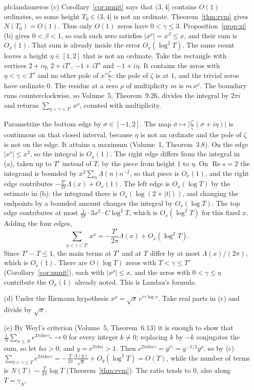 \begin{solution}{pb:landauzeros}
(c) Corollary~\ref{cor:nunit} says that $(3,4]$ contains $O(1)$ ordinates, so some height $T_0\in(3,4]$ is not an ordinate. Theorem~\ref{thm:rvm} gives $N(T_0)=O(1)$. Thus only $O(1)$ zeros have $0<\gamma\le3$. Proposition~\ref{prop:xi}(b) gives $0<\beta<1$, so each such zero satisfies $|x^\rho|=x^\beta\le x$, and their sum is $O_x(1)$. That sum is already inside the error $O_x(\log^2T)$. The same count leaves a height $\eta\in[1,2]$ that is not an ordinate. Take the rectangle with vertices $2+i\eta$, $2+iT'$, $-1+iT'$ and $-1+i\eta$. It contains the zeros with $\eta<\gamma<T'$ and no other pole of $x^s\frac{\zeta'}\zeta$: the pole of $\zeta$ is at $1$, and the trivial zeros have ordinate $0$. The residue at a zero $\rho$ of multiplicity $m$ is $m\,x^\rho$. The boundary runs counterclockwise, so Volume~5, Theorem~9.26, divides the integral by $2\pi i$ and returns $\sum_{\eta<\gamma<T'}x^\rho$, counted with multiplicity.

Parametrize the bottom edge by $\sigma\in[-1,2]$. The map $\sigma\mapsto\bigl|\frac{\zeta'}\zeta(\sigma+i\eta)\bigr|$ is continuous on that closed interval, because $\eta$ is not an ordinate and the pole of $\zeta$ is not on the edge. It attains a maximum (Volume~1, Theorem~3.8). On the edge $|x^s|\le x^2$, so the integral is $O_x(1)$. The right edge differs from the integral in (a), taken up to $T'$ instead of $T$, by the piece from height $1$ to $\eta$. On $\operatorname{Re}s=2$ the integrand is bounded by $x^2\sum_n\Lambda(n)n^{-2}$, so that piece is $O_x(1)$, and the right edge contributes $-\frac{T'}{2\pi}\Lambda(x)+O_x(1)$. The left edge is $O_x(\log T)$ by the estimate in (b): the integrand there is $O_x(\log(2+|t|))$, and changing the endpoints by a bounded amount changes the integral by $O_x(\log T)$. The top edge contributes at most $\frac1{2\pi}\cdot3x^2\cdot C\log^2T$, which is $O_x(\log^2T)$ for this fixed $x$. Adding the four edges,
\[
\sum_{\eta<\gamma<T'}x^\rho=-\frac{T'}{2\pi}\Lambda(x)+O_x(\log^2T).
\]
Since $T'-T\le1$, the main terms at $T'$ and at $T$ differ by at most $\Lambda(x)/(2\pi)$, which is $O_x(1)$. There are $O(\log T)$ zeros with $T<\gamma\le T'$ (Corollary~\ref{cor:nunit}), each with $|x^\rho|\le x$, and the zeros with $0<\gamma\le\eta$ contribute the $O_x(1)$ already noted. This is Landau's formula.

(d) Under the Riemann hypothesis $x^\rho=\sqrt x\,e^{i\gamma\log x}$. Take real parts in (c) and divide by $\sqrt x$.

(e) By Weyl's criterion (Volume~5, Theorem~6.13) it is enough to show that $\frac1N\sum_{n\le N}e^{2\pi ik\alpha\gamma_n}\to0$ for every integer $k\ne0$; replacing $k$ by $-k$ conjugates the sum,
so let $k\alpha>0$, and $y=e^{2\pi k\alpha}>1$. Then $e^{2\pi ik\alpha\gamma}=y^{i\gamma}=y^{-1/2}y^\rho$, so by (c)
$\sum_{0<\gamma\le T}e^{2\pi ik\alpha\gamma}=-\frac T{2\pi}\frac{\Lambda(y)}{\sqrt y}+O_y(\log^2T)=O(T)$, while the number of terms is $N(T)\sim\frac T{2\pi}\log T$ (Theorem~\ref{thm:rvm}).
The ratio tends to $0$, also along $T=\gamma_N$.


\end{solution}
